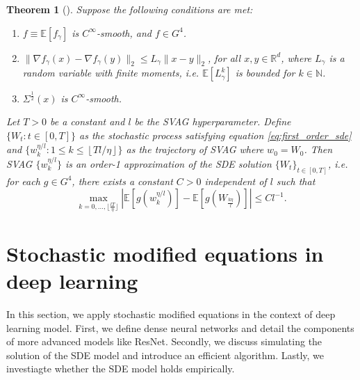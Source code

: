 \documentclass[12pt]{article}
\newtheorem{theorem}{Theorem}[section]
\theoremstyle{definition}
\numberwithin{equation}{section}
\newcommand{\N}{\mathbb{N}}
\newcommand{\R}{\mathbb{R}}
\newcommand{\ev}[1]{\mathbb{E}\left[{#1}\right]}
\newcommand{\norm}[1]{\lVert{#1}\rVert_2}
\begin{document}
\begin{theorem}[\cite{liValidityModelingSGD2021}]
  Suppose the following conditions are met:
  \begin{enumerate}[label=(\roman*)]
    \item $f \equiv \ev{f_{\gamma}}$ is $C^{\infty}$-smooth, and $f \in G^4$.
    \item $\norm{\nabla f_{\gamma}(x) - \nabla f_{\gamma}(y)} \leq L_{\gamma} \norm{x - y}$, for all $x, y \in \R^d$, where $L_{\gamma}$ is a random variable with finite moments, i.e. $\ev{L_{\gamma}^k}$ is bounded for $k \in \N$.
    \item $\Sigma^{\frac{1}{2}}(x)$ is $C^{\infty}$-smooth.
  \end{enumerate}
  Let $T > 0$ be a constant and $l$ be the SVAG hyperparameter. Define $\{W_t : t \in [0,T] \}$ as the stochastic process satisfying equation \eqref{eq:first_order_sde} and $\{w_k^{\eta/l}: 1 \leq k \leq \left\lfloor Tl/\eta \right\rfloor \}$ as the trajectory of SVAG where $w_0 = W_0$. Then SVAG $\{w_k^{\eta/l}\}$ is an order-1 approximation of the SDE solution $\{W_t\}_{t \in [0,T]}$, i.e. for each $g \in G^4$, there exists a constant $C > 0$ independent of $l$ such that
  \begin{equation*}
    \max_{k=0,\dots, \lfloor \frac{lT}{\eta} \rfloor} \left\lvert \ev{g(w^{\eta/l}_k)} - \ev{g(W_{\frac{k\eta}{l}})} \right\rvert \leq C l^{-1}.
  \end{equation*}
\end{theorem}
\section{Stochastic modified equations in deep learning}
\label{sec:smdedl}
In this section, we apply stochastic modified equations in the context of deep learning model. First, we define dense neural networks and detail the components of more advanced models like ResNet. Secondly, we discuss simulating the solution of the SDE model and introduce an efficient algorithm. Lastly, we investiagte whether the SDE model holds empirically.
\end{document}
